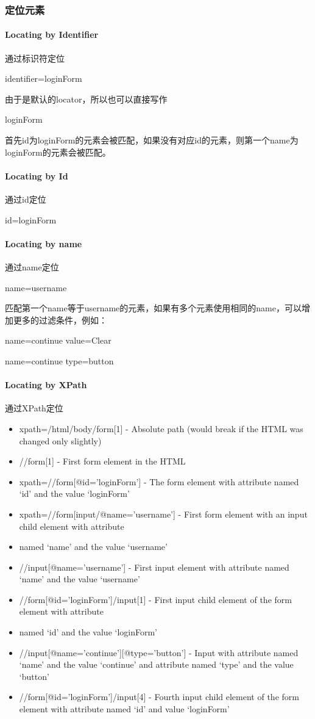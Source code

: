 \subsubsection{定位元素}

\paragraph{Locating by Identifier} 通过标识符定位

identifier=loginForm

由于是默认的locator，所以也可以直接写作

loginForm

首先id为loginForm的元素会被匹配，如果没有对应id的元素，则第一个name为loginForm的元素会被匹配。

\paragraph{Locating by Id} 通过id定位

id=loginForm

\paragraph{Locating by name} 通过name定位

name=username

匹配第一个name等于username的元素，如果有多个元素使用相同的name，可以增加更多的过滤条件，例如：

name=continue value=Clear

name=continue type=button

\paragraph{Locating by XPath} 通过XPath定位
\begin{itemize}
\item xpath=/html/body/form[1] - Absolute path (would break if the HTML was changed only slightly)
\item //form[1] - First form element in the HTML
\item xpath=//form[@id='loginForm'] - The form element with attribute named ‘id’ and the value ‘loginForm’
\item xpath=//form[input/@name='username'] - First form element with an input child element with attribute \item named ‘name’ and the value ‘username’
\item //input[@name='username'] - First input element with attribute named ‘name’ and the value ‘username’
\item //form[@id='loginForm']/input[1] - First input child element of the form element with attribute \item named ‘id’ and the value ‘loginForm’
\item //input[@name='continue'][@type='button'] - Input with attribute named ‘name’ and the value ‘continue’ and attribute named ‘type’ and the value ‘button’
\item  //form[@id='loginForm']/input[4] - Fourth input child element of the form element with attribute named ‘id’ and value ‘loginForm’
\end{itemize}


